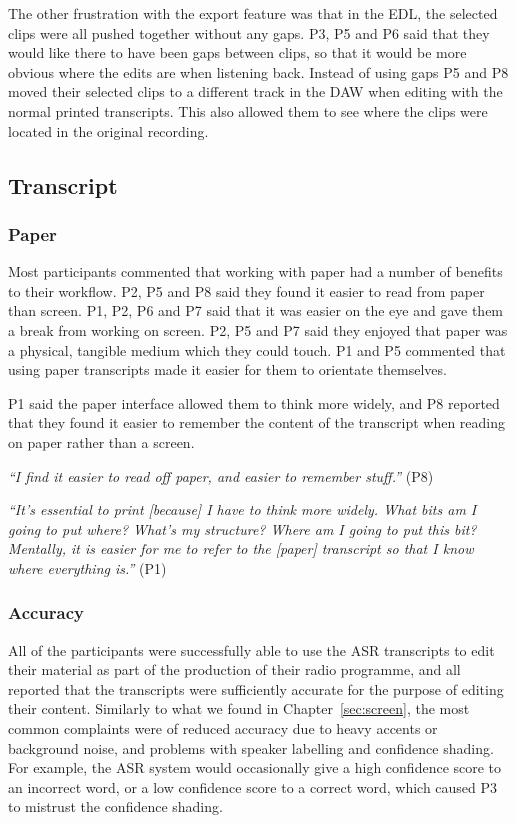 The other frustration with the export feature was that in the EDL, the selected clips were all pushed together without
any gaps. P3, P5 and P6 said that they would like there to have been gaps between clips, so that it would be more
obvious where the edits are when listening back. Instead of using gaps P5 and P8 moved their selected clips to a
different track in the DAW when editing with the normal printed transcripts. This also allowed them to see where the
clips were located in the original recording.


\subsection{Transcript}

\subsubsection{Paper}

Most participants commented that working with paper had a number of benefits to their workflow.  P2, P5 and P8 said
they found it easier to read from paper than screen.  P1, P2, P6 and P7 said that it was easier on the eye and gave
them a break from working on screen.  P2, P5 and P7 said they enjoyed that paper was a physical, tangible medium which
they could touch.  P1 and P5 commented that using paper transcripts made it easier for them to orientate themselves.


P1 said the paper interface allowed them to think more widely, and P8 reported that they found it easier to remember
the content of the transcript when reading on paper rather than a screen. 




\textit{``I find it easier to read off paper, and easier to remember stuff.''} (P8)

\textit{``It's essential to print [because]
I have to think more widely. What bits am I going to put where? What's my
  structure? Where am I going to put this bit? Mentally, it is easier for me to refer to the [paper] transcript so
that I know where everything is.''} (P1)



\subsubsection{Accuracy}

All of the participants were successfully able to use the ASR transcripts to edit their material as
part of the production of their radio programme, and all reported that the transcripts were sufficiently accurate for
the purpose of editing their content. Similarly to what we found in Chapter~\ref{sec:screen}, the most common
complaints were of reduced accuracy due to heavy accents or background noise, and problems with speaker labelling and
confidence shading. For example, the ASR system would occasionally give a high confidence score to an
incorrect word, or a low confidence score to a correct word, which caused P3 to mistrust the confidence shading.

